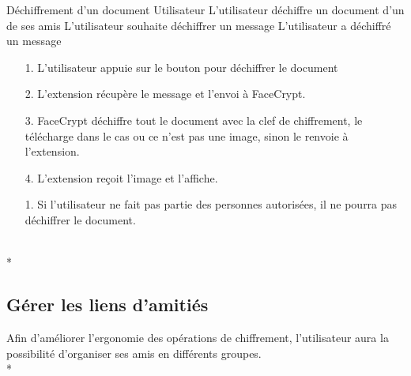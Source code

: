 \documentclass[a4paper,11pt,french]{article}
\begin{document}
\fiche
	{Déchiffrement d'un document}
	{Utilisateur}
	{L'utilisateur déchiffre un document d'un de ses amis}
	{}
	{L'utilisateur souhaite déchiffrer un message}
	{L'utilisateur a déchiffré un message}
    {\begin{itemize}
        \item[]
        \item[1.] L'utilisateur appuie sur le bouton pour déchiffrer
            le document
    \end{itemize}
    }
	{\begin{itemize}
        \item[]
		\item[2.] L'extension récupère le message et l'envoi à 
            FaceCrypt.
		\item[3.] FaceCrypt déchiffre tout le document avec la clef
            de chiffrement, le télécharge dans le cas ou ce n'est pas
            une image, sinon le renvoie à l'extension.
        \item[4.] L'extension reçoit l'image et l'affiche.
	\end{itemize}
	}
	{}
\flots
    {}
    {\begin{itemize}
    \item[]
    \item[1.] Si l'utilisateur ne fait pas partie des personnes
        autorisées, il ne pourra pas déchiffrer le document.
    \end{itemize}
    }
	{}    
\\*

\subsection{Gérer les liens d'amitiés}
Afin d'améliorer l'ergonomie des opérations de chiffrement, 
l'utilisateur aura la possibilité d'organiser ses amis en
différents groupes. \\*
\end{document}
